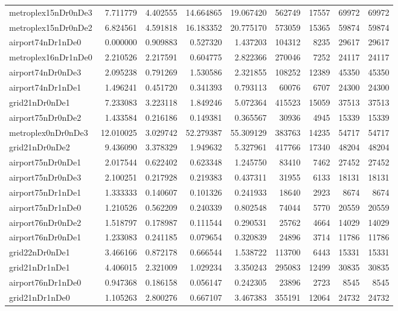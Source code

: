 \begin{longtable}{|l|r|r|r|r|r|r|r|r|}
metroplex15nDr0nDe3 & 7.711779 & 4.402555 & 14.664865 & 19.067420 & 562749 & 17557 & 69972 & 69972 \\
metroplex15nDr0nDe2 & 6.824561 & 4.591818 & 16.183352 & 20.775170 & 573059 & 15365 & 59874 & 59874 \\
airport74nDr1nDe0 & 0.000000 & 0.909883 & 0.527320 & 1.437203 & 104312 & 8235 & 29617 & 29617 \\
metroplex16nDr1nDe0 & 2.210526 & 2.217591 & 0.604775 & 2.822366 & 270046 & 7252 & 24117 & 24117 \\
airport74nDr0nDe3 & 2.095238 & 0.791269 & 1.530586 & 2.321855 & 108252 & 12389 & 45350 & 45350 \\
airport74nDr1nDe1 & 1.496241 & 0.451720 & 0.341393 & 0.793113 & 60076 & 6707 & 24300 & 24300 \\
grid21nDr0nDe1 & 7.233083 & 3.223118 & 1.849246 & 5.072364 & 415523 & 15059 & 37513 & 37513 \\
airport75nDr0nDe2 & 1.433584 & 0.216186 & 0.149381 & 0.365567 & 30936 & 4945 & 15339 & 15339 \\
metroplex0nDr0nDe3 & 12.010025 & 3.029742 & 52.279387 & 55.309129 & 383763 & 14235 & 54717 & 54717 \\
grid21nDr0nDe2 & 9.436090 & 3.378329 & 1.949632 & 5.327961 & 417766 & 17340 & 48204 & 48204 \\
airport75nDr0nDe1 & 2.017544 & 0.622402 & 0.623348 & 1.245750 & 83410 & 7462 & 27452 & 27452 \\
airport75nDr0nDe3 & 2.100251 & 0.217928 & 0.219383 & 0.437311 & 31955 & 6133 & 18131 & 18131 \\
airport75nDr1nDe1 & 1.333333 & 0.140607 & 0.101326 & 0.241933 & 18640 & 2923 & 8674 & 8674 \\
airport75nDr1nDe0 & 1.210526 & 0.562209 & 0.240339 & 0.802548 & 74044 & 5770 & 20559 & 20559 \\
airport76nDr0nDe2 & 1.518797 & 0.178987 & 0.111544 & 0.290531 & 25762 & 4664 & 14029 & 14029 \\
airport76nDr0nDe1 & 1.233083 & 0.241185 & 0.079654 & 0.320839 & 24896 & 3714 & 11786 & 11786 \\
grid22nDr0nDe1 & 3.466166 & 0.872178 & 0.666544 & 1.538722 & 113700 & 6443 & 15331 & 15331 \\
grid21nDr1nDe1 & 4.406015 & 2.321009 & 1.029234 & 3.350243 & 295083 & 12499 & 30835 & 30835 \\
airport76nDr1nDe0 & 0.947368 & 0.186158 & 0.056147 & 0.242305 & 23896 & 2723 & 8545 & 8545 \\
grid21nDr1nDe0 & 1.105263 & 2.800276 & 0.667107 & 3.467383 & 355191 & 12064 & 24732 & 24732 \\

\end{longtable}
